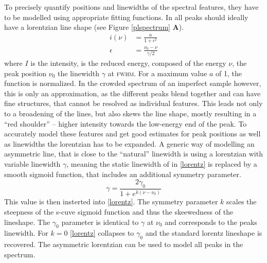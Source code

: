 To precisely quantify positions and linewidths of the spectral features, they have to be modelled using appropriate fitting functions. In \pl all peaks should ideally have a lorentzian line shape (see Figure \ref{plspectrum} \textbf{A}). 
\begin{align}
i(\nu)&= \frac{a}{1+\epsilon^2} \\
\epsilon &= \frac{\nu_0 - \nu}{\gamma /2}\label{lorentz}
\end{align}
where $I$ is the intensity, \epsilon is the reduced energy, composed of the energy $\nu$, the peak position $\nu_0$ the linewidth $\gamma$ at \textsc{fwhm}. For a maximum value $a$ of 1, the function is normalized. In the crowded spectrum of an imperfect sample however, this is only an approximation, as the different peaks blend together and can have fine structures, that cannot be resolved as individual features. This leads not only to a broadening of the lines, but also skews the line shape, mostly resulting in a ``red shoulder'' -- higher intensity towards the low-energy end of the peak. To accurately model these features and get good estimates for peak positions as well as linewidths the lorentzian has to be expanded. A generic way of modelling an asymmetric line, that is close to the ``natural'' linewidth is using a lorentzian with variable linewidth $\gamma$, meaning the static linewidth of in \ref{lorentz} is replaced by a smooth sigmoid function, that includes an additional symmetry parameter\cite{stancik_simple_2008}.
\begin{equation} \gamma = \frac{2\gamma_0}{1+e^{k(\nu-\nu_0)}}\label{asymlorentz} \end{equation}
This value is then insterted into \eqref{lorentz}. The symmetry parameter $k$ scales the steepness of the s-cuve sigmoid function and thus the skeewedness of the lineshape. The $\gamma_0$ parameter is identical to $\gamma$ at $\nu_0$ and corresponds to the peaks linewidth. For $k=0$ \eqref{lorentz} collapses to $\gamma_0$ and the standard lorentz lineshape is recovered. The asymmetric lorentzian can be used to model all peaks in the \pl spectrum.

